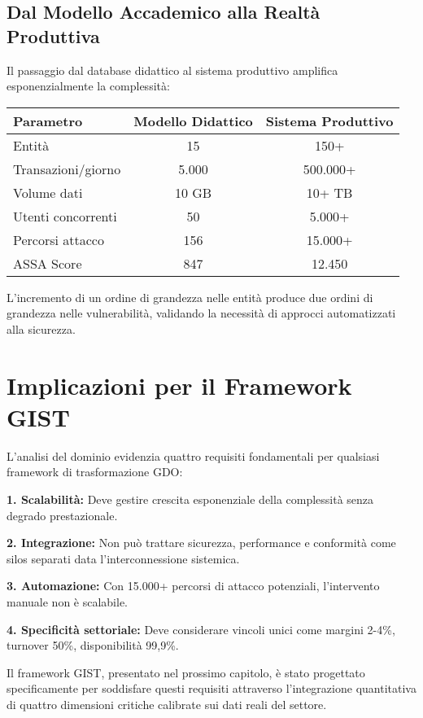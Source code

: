 \subsection{Dal Modello Accademico alla Realtà Produttiva}
\label{subsec:scalabilita}

Il passaggio dal database didattico al sistema produttivo amplifica esponenzialmente la complessità:

\begin{center}
\begin{tabular}{lcc}
\toprule
\textbf{Parametro} & \textbf{Modello Didattico} & \textbf{Sistema Produttivo} \\
\midrule
Entità & 15 & 150+ \\
Transazioni/giorno & 5.000 & 500.000+ \\
Volume dati & 10 GB & 10+ TB \\
Utenti concorrenti & 50 & 5.000+ \\
Percorsi attacco & 156 & 15.000+ \\
ASSA Score & 847 & 12.450 \\
\bottomrule
\end{tabular}
\end{center}

L'incremento di un ordine di grandezza nelle entità produce due ordini di grandezza nelle vulnerabilità, validando la necessità di approcci automatizzati alla sicurezza.

\section{Implicazioni per il Framework GIST}
\label{sec:implicazioni}

L'analisi del dominio evidenzia quattro requisiti fondamentali per qualsiasi framework di trasformazione GDO:

\textbf{1. Scalabilità:} Deve gestire crescita esponenziale della complessità senza degrado prestazionale.

\textbf{2. Integrazione:} Non può trattare sicurezza, performance e conformità come silos separati data l'interconnessione sistemica.

\textbf{3. Automazione:} Con 15.000+ percorsi di attacco potenziali, l'intervento manuale non è scalabile.

\textbf{4. Specificità settoriale:} Deve considerare vincoli unici come margini 2-4\%, turnover 50\%, disponibilità 99,9\%.

Il framework GIST, presentato nel prossimo capitolo, è stato progettato specificamente per soddisfare questi requisiti attraverso l'integrazione quantitativa di quattro dimensioni critiche calibrate sui dati reali del settore.

